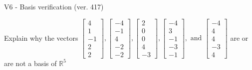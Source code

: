 \begin{exercise}
  \begin{exerciseTitle}V6 - Basis verification (ver. 417)\end{exerciseTitle}
  \begin{exerciseStatement}
    Explain why the vectors \(\left[\begin{array}{r}
4 \\
1 \\
-1 \\
2 \\
2
\end{array}\right] , \left[\begin{array}{r}
-4 \\
-1 \\
4 \\
-2 \\
-2
\end{array}\right] , \left[\begin{array}{r}
2 \\
0 \\
0 \\
4 \\
-3
\end{array}\right] , \left[\begin{array}{r}
-4 \\
3 \\
-1 \\
-3 \\
-1
\end{array}\right] , \text{ and } \left[\begin{array}{r}
-4 \\
4 \\
4 \\
-3 \\
4
\end{array}\right]\) are or are not a basis of \(\mathbb{R}^5\)	



\end{exerciseStatement}
\end{exercise}
